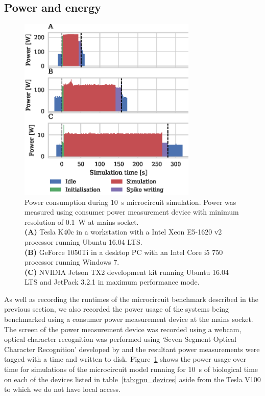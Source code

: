 \documentclass[utf8]{frontiersSCNS} %
\begin{document}
\subsection{Power and energy}
\label{sec:results/power}
\begin{figure}
    \begin{center}
        \includegraphics[width=85mm]{figures/microcircuit_power}
    \end{center}
    \caption{Power consumption during \SI{10}{\second} microcircuit simulation.
    Power was measured using consumer power measurement device with minimum resolution of \SI{0.1}{\watt} at mains socket.\\
    \textbf{(A)} Tesla K40c in a workstation with a Intel Xeon E5-1620 v2 processor running Ubuntu 16.04 LTS.\\
    \textbf{(B)} GeForce 1050Ti in a desktop PC with an Intel Core i5 750 processor running Windows 7.\\
    \textbf{(C)} NVIDIA Jetson TX2 development kit running Ubuntu 16.04 LTS and JetPack 3.2.1 in maximum performance mode.}
    \label{fig:microcircuit_power}
\end{figure}

As well as recording the runtimes of the microcircuit benchmark described in the previous section, we also recorded the power usage of the systems being benchmarked using a consumer power measurement device at the mains socket.
The screen of the power measurement device was recorded using a webcam, optical character recognition was performed using `Seven Segment Optical Character Recognition' developed by \citet{Auerswald2018} and the resultant power measurements were tagged with a time and written to disk.
Figure~\ref{fig:microcircuit_power} shows the power usage over time for simulations of the microcircuit model running for \SI{10}{\second} of biological time on each of the devices listed in table~\ref{tab:gpu_devices} aside from the Tesla V100 to which we do not have local access.
\end{document}
